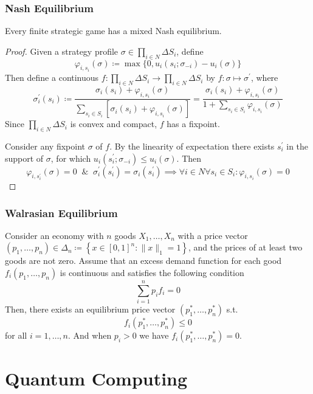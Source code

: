 \documentclass[UTF8,aspectratio=43,11pt,colorlinks,compress,openany]{beamer}%
\begin{document}
\begin{frame}\frametitle{Nash Equilibrium}
\setlength\abovedisplayskip{0pt}
\setlength\belowdisplayskip{0pt}
\begin{theorem}
	Every finite strategic game has a mixed Nash equilibrium.
\end{theorem}
\begin{proof}
	Given a strategy profile $\sigma\in\prod\limits_{i\in N}\Delta S_i$, define
	\[\varphi_{i,s_i}(\sigma)\coloneqq \max\big\{0,u_i(s_i;\sigma_{-i})-u_i(\sigma)\big\}\]
	Then define a continuous $f: \prod\limits_{i\in N}\Delta S_i\to\prod\limits_{i\in N}\Delta S_i$ by $f: \sigma\mapsto\sigma^\prime$, where
	\[
	\sigma_i^\prime(s_i)\coloneqq \dfrac{\sigma_i(s_i)+\varphi_{i,s_i}(\sigma)}{\sum\limits_{s_i\in S_i}\left[\sigma_i(s_i)+\varphi_{i,s_i}(\sigma)\right]}=\dfrac{\sigma_i(s_i)+\varphi_{i,s_i}(\sigma)}{1+\sum\limits_{s_i\in S_i}\varphi_{i,s_i}(\sigma)}
	\]
	Since $\prod\limits_{i\in N}\Delta S_i$ is convex and compact, $f$ has a fixpoint.

	Consider any fixpoint $\sigma$ of $f$. By the linearity of expectation there exists $s_i^\prime$ in the support of $\sigma$, for which $u_i(s_i^\prime;\sigma_{-i})\leq u_i(\sigma)$. Then
	\[\varphi_{i,s_i^\prime}(\sigma)=0\;\;\&\;\;\sigma_i^\prime(s_i^\prime)=\sigma_i(s_i^\prime)\implies\forall i\in N\forall s_i\in S_i: \varphi_{i,s_i}(\sigma)=0\]
\end{proof}
\end{frame}

\begin{frame}\frametitle{Walrasian Equilibrium}
\begin{theorem}
Consider an economy with $n$ goods $X_1,\dots, X_n$ with a price vector $(p_1,\dots, p_n)\in\Delta_n\coloneqq \left\{x\in[0,1]^n:\|x\|_1=1\right\}$, and the prices of at least two goods are not zero. Assume that an excess demand function for each good $f_i(p_1,\dots, p_n)$ is continuous and satisfies the following condition
\[\sum\limits_{i=1}^n p_if_i=0\tag{Walras Law}\]
Then, there exists an equilibrium price vector $(p_1^*,\dots,p_n^*)$ s.t.
\[f_i(p_1^*,\dots,p_n^*)\leq 0\]
for all $i=1,\dots,n$. And when $p_i>0$ we have $f_i(p_1^*,\dots,p_n^*)=0$.
\end{theorem}
\end{frame}


\section{Quantum Computing}
\end{document}
